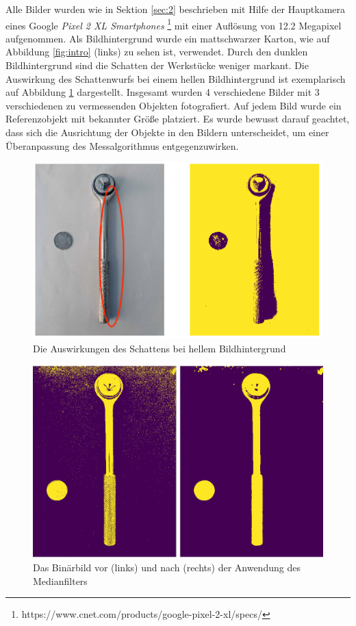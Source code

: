 \documentclass[twocolumn,10pt]{asme2ej}
\begin{document}
Alle Bilder wurden wie in Sektion \ref{sec:2} beschrieben mit Hilfe der Hauptkamera eines Google \emph{Pixel 2 XL Smartphones} \footnote{https://www.cnet.com/products/google-pixel-2-xl/specs/} mit einer Auflösung von 12.2 Megapixel aufgenommen. Als Bildhintergrund wurde ein mattschwarzer Karton, wie auf Abbildung \ref{fig:intro} (links) zu sehen ist, verwendet. Durch den dunklen Bildhintergrund sind die Schatten der Werkstücke weniger markant. Die Auswirkung des Schattenwurfs bei einem hellen Bildhintergrund ist exemplarisch auf Abbildung \ref{fig:shade} dargestellt. Insgesamt wurden 4 verschiedene Bilder mit 3 verschiedenen zu vermessenden Objekten fotografiert. Auf jedem Bild wurde ein Referenzobjekt mit bekannter Größe platziert. Es wurde bewusst darauf geachtet, dass sich die Ausrichtung der Objekte in den Bildern unterscheidet, um einer Überanpassung des Messalgorithmus entgegenzuwirken.

\begin{figure}
	\includegraphics[scale=0.25]{bad_shade_white_background.png}
	\caption[center]{Die Auswirkungen des Schattens bei hellem Bildhintergrund}
	\label{fig:shade}
\end{figure}

\begin{figure}
	\includegraphics[scale=0.2]{blurr}
	\caption[center]{Das Binärbild vor (links) und nach (rechts) der Anwendung des Medianfilters}
	\label{fig:blurr}
\end{figure}
\end{document}

